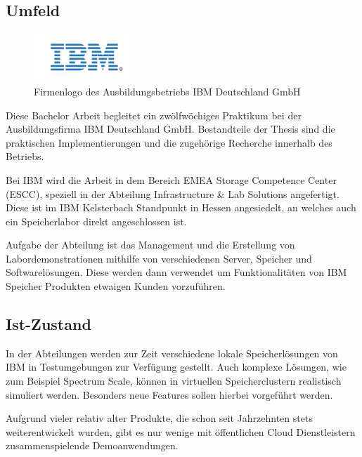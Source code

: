 \subsection{Umfeld} \label{subsec:enviroment}

\begin{figure}
	\begin{center}
		\includegraphics[width=0.32\textwidth]{images/firma-deckblatt}
	\end{center}
	\caption{Firmenlogo des Ausbildungsbetriebs IBM Deutschland GmbH}
\end{figure}

Diese Bachelor Arbeit begleitet ein zwölfwöchiges Praktikum bei der Ausbildungsfirma IBM Deutschland GmbH. Bestandteile der Thesis sind die praktischen Implementierungen und die zugehörige Recherche innerhalb des Betriebs. 

Bei IBM wird die Arbeit in dem Bereich EMEA Storage Competence Center (ESCC), speziell in der Abteilung Infrastructure \& Lab Solutions angefertigt. Diese ist im IBM Kelsterbach Standpunkt in Hessen angesiedelt, an welches auch ein Speicherlabor direkt angeschlossen ist.

Aufgabe der Abteilung ist das Management und die Erstellung von Labordemonstrationen mithilfe von verschiedenen Server, Speicher und Softwarelösungen. Diese werden dann verwendet um Funktionalitäten von IBM Speicher Produkten etwaigen Kunden vorzuführen.

\subsection{Ist-Zustand}

In der Abteilungen werden zur Zeit verschiedene lokale Speicherlösungen von IBM in Testumgebungen zur Verfügung gestellt. Auch komplexe Lösungen, wie zum Beispiel Spectrum Scale, können in virtuellen Speicherclustern realistisch simuliert werden. Besonders neue Features sollen hierbei vorgeführt werden.

Aufgrund vieler relativ alter Produkte, die schon seit Jahrzehnten stets weiterentwickelt wurden, gibt es nur wenige mit öffentlichen Cloud Dienstleistern zusammenspielende Demoanwendungen.

